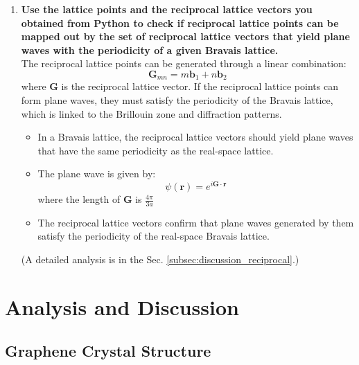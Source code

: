\documentclass[12pt,a4paper]{article}
\begin{document}
\begin{CJK}{UTF8}{bkai}
\begin{enumerate}
\begin{enumerate}
    \end{enumerate}
    \clearpage
    \item \textbf{Use the lattice points and the reciprocal lattice vectors you obtained from Python to check if reciprocal lattice points can be mapped out by the set of reciprocal lattice vectors that yield plane waves with the periodicity of a given Bravais lattice.}\\
    The reciprocal lattice points can be generated through a linear combination:
    \begin{equation}
        \mathbf{G}_{mn} = m\mathbf{b}_1 + n\mathbf{b}_2
     \end{equation}
     where $\mathbf{G}$ is the reciprocal lattice vector. If the reciprocal lattice points can form plane waves, they must satisfy the periodicity of the Bravais lattice, which is linked to the Brillouin zone and diffraction patterns.
    \begin{itemize}
        \item In a Bravais lattice, the reciprocal lattice vectors should yield plane waves that have the same periodicity as the real-space lattice.
        \item The plane wave is given by:
        \begin{equation}
            \psi(\mathbf{r}) = e^{i \mathbf{G\cdot r}}
        \end{equation}
        where the length of $\mathbf{G}$ is $\frac{4\pi}{3a}$
        \item The reciprocal lattice vectors confirm that plane waves generated by them satisfy the periodicity of the real-space Bravais lattice.
    \end{itemize}
    (A detailed analysis is in the Sec. \ref{subsec:discussion_reciprocal}.)
\end{enumerate}



\section{Analysis and Discussion}\label{sec:discussion}

\subsection{Graphene Crystal Structure}\label{subsec:discussion_graphene}


\end{CJK}
\end{document}

